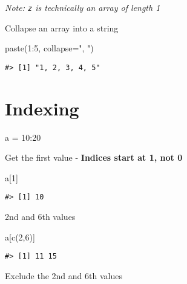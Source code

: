 \documentclass[
]{book}
\newenvironment{Shaded}{\begin{snugshade}}{\end{snugshade}}
\newcommand{\AttributeTok}[1]{\textcolor[rgb]{0.77,0.63,0.00}{#1}}
\newcommand{\DecValTok}[1]{\textcolor[rgb]{0.00,0.00,0.81}{#1}}
\newcommand{\FunctionTok}[1]{\textcolor[rgb]{0.00,0.00,0.00}{#1}}
\newcommand{\NormalTok}[1]{#1}
\newcommand{\OtherTok}[1]{\textcolor[rgb]{0.56,0.35,0.01}{#1}}
\newcommand{\SpecialCharTok}[1]{\textcolor[rgb]{0.00,0.00,0.00}{#1}}
\newcommand{\StringTok}[1]{\textcolor[rgb]{0.31,0.60,0.02}{#1}}
\begin{document}
\emph{Note: \texttt{z} is technically an array of length 1}

Collapse an array into a string

\begin{Shaded}
\begin{Highlighting}[]
\FunctionTok{paste}\NormalTok{(}\DecValTok{1}\SpecialCharTok{:}\DecValTok{5}\NormalTok{, }\AttributeTok{collapse=}\StringTok{", "}\NormalTok{)}
\end{Highlighting}
\end{Shaded}

\begin{verbatim}
#> [1] "1, 2, 3, 4, 5"
\end{verbatim}

\hypertarget{indexing}{%
\section{Indexing}\label{indexing}}

\begin{Shaded}
\begin{Highlighting}[]
\NormalTok{a }\OtherTok{=} \DecValTok{10}\SpecialCharTok{:}\DecValTok{20}
\end{Highlighting}
\end{Shaded}

Get the first value - \textbf{Indices start at 1, not 0}

\begin{Shaded}
\begin{Highlighting}[]
\NormalTok{a[}\DecValTok{1}\NormalTok{]}
\end{Highlighting}
\end{Shaded}

\begin{verbatim}
#> [1] 10
\end{verbatim}

2nd and 6th values

\begin{Shaded}
\begin{Highlighting}[]
\NormalTok{a[}\FunctionTok{c}\NormalTok{(}\DecValTok{2}\NormalTok{,}\DecValTok{6}\NormalTok{)]}
\end{Highlighting}
\end{Shaded}

\begin{verbatim}
#> [1] 11 15
\end{verbatim}

Exclude the 2nd and 6th values
\end{document}
